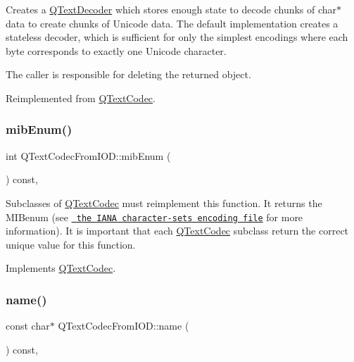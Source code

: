 Creates a \mbox{\hyperlink{class_q_text_decoder}{Q\+Text\+Decoder}} which stores enough state to decode chunks of char$\ast$ data to create chunks of Unicode data. The default implementation creates a stateless decoder, which is sufficient for only the simplest encodings where each byte corresponds to exactly one Unicode character.

The caller is responsible for deleting the returned object. 

Reimplemented from \mbox{\hyperlink{class_q_text_codec_abb65882aa316a2ad49a10e9f86c4dc88}{Q\+Text\+Codec}}.

\mbox{\label{class_q_text_codec_from_i_o_d_aa2a1123c86835c8395a058082c9fbdd3}} 
\subsubsection{\texorpdfstring{mibEnum()}{mibEnum()}}
{\footnotesize\ttfamily int Q\+Text\+Codec\+From\+I\+O\+D\+::mib\+Enum (\begin{DoxyParamCaption}{ }\end{DoxyParamCaption}) const\hspace{0.3cm}{\ttfamily [inline]}, {\ttfamily [virtual]}}

Subclasses of \mbox{\hyperlink{class_q_text_codec}{Q\+Text\+Codec}} must reimplement this function. It returns the M\+I\+Benum (see \href{ftp://ftp.isi.edu/in-notes/iana/assignments/character-sets}{\texttt{ the I\+A\+NA character-\/sets encoding file}} for more information). It is important that each \mbox{\hyperlink{class_q_text_codec}{Q\+Text\+Codec}} subclass return the correct unique value for this function. 

Implements \mbox{\hyperlink{class_q_text_codec_aa0118daa4f82235ae9d5bb70a168c992}{Q\+Text\+Codec}}.

\mbox{\label{class_q_text_codec_from_i_o_d_ac80023588673bad8a8b0d6983832c884}} 
\subsubsection{\texorpdfstring{name()}{name()}}
{\footnotesize\ttfamily const char$\ast$ Q\+Text\+Codec\+From\+I\+O\+D\+::name (\begin{DoxyParamCaption}{ }\end{DoxyParamCaption}) const\hspace{0.3cm}{\ttfamily [inline]}, {\ttfamily [virtual]}}

